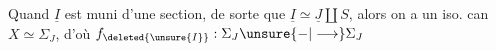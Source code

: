 
\hrulefill

Quand \(\underline I\) est muni d'une section, de sorte que \(\underline I\simeq\underline J\amalg S\), alors on a un iso. can \(X\simeq\Sigma_J\), d'où \(f_{\deleted{\unsure{I}}}:\Sigma_J\unsure{-|\longrightarrow}\Sigma_J\)
